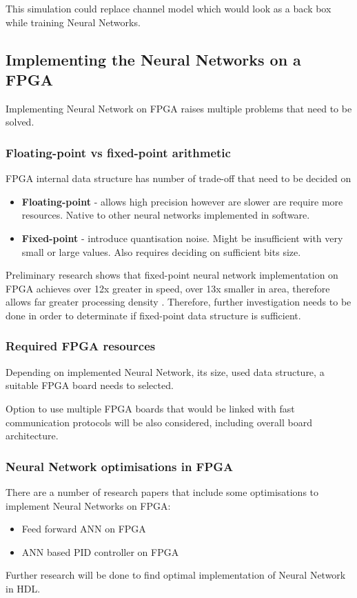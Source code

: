 This simulation could replace channel model which would look as a back box while training Neural Networks.

\subsection{Implementing the Neural Networks on a FPGA}

Implementing Neural Network on FPGA raises multiple problems that need to be solved.
 
\subsubsection{Floating-point vs fixed-point arithmetic}
FPGA internal data structure has number of trade-off that need to be decided on
\begin{itemize}
	\item \textbf{Floating-point} - allows high precision however are slower are require more resources. Native to other neural networks implemented in software.
	\item \textbf{Fixed-point} - introduce quantisation noise. Might be insufficient with very small or large values. Also requires deciding on sufficient bits size.
\end{itemize}
Preliminary research shows that fixed-point neural network implementation on FPGA achieves over 12x greater in speed, over 13x smaller in area, therefore allows far greater processing density \autocite{omondi_rajapakse_2006}. Therefore, further investigation needs to be done in order to determinate if fixed-point data structure is sufficient.

\subsubsection{Required FPGA resources}
 Depending on implemented Neural Network, its size, used data structure, a suitable FPGA board needs to selected. 
 
 Option to use multiple FPGA boards that would be linked with fast communication protocols will be also considered, including overall board architecture.

\subsubsection{Neural Network optimisations in FPGA} 
There are a number of research papers that include some optimisations to implement Neural Networks on FPGA: 
\begin{itemize}
	\item Feed forward ANN on FPGA \autocite{7011454}
	\item ANN based PID controller on FPGA \autocite{5328349}
\end{itemize}
Further research will be done to find optimal implementation of Neural Network in HDL.

